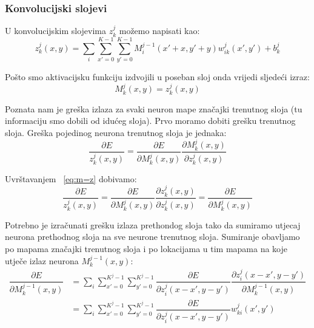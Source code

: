 \documentclass[times, utf8, zavrsni, numeric]{fer}
\begin{document}
\subsubsection{Konvolucijski slojevi}
U konvolucijskim slojevima $z_k^j$ možemo napisati kao:
\begin{equation}
z^j_k (x, y) = \sum_i \sum_{x'=0}^{K-1} \sum_{y'=0}^{K-1} M^{j-1}_i (x' + x, y' + y) w^j_{ik} (x', y') + b^j_k
\end{equation}

Pošto smo aktivacijsku funkciju izdvojili u poseban sloj onda vrijedi sljedeći izraz:
\begin{equation}\label{eq:m=z}
M^j_k (x, y) = z^j_k (x, y)
\end{equation}

Poznata nam je greška izlaza za svaki neuron mape značajki trenutnog sloja (tu informaciju smo dobili od idućeg sloja). Prvo moramo dobiti grešku trenutnog sloja. Greška pojedinog neurona trenutnog sloja je jednaka: 
\begin{equation}
\dfrac{\partial E}{z^j_k (x, y)} = \dfrac{\partial E}{\partial M^j_k (x, y)} \dfrac{\partial M^j_k (x, y)}{\partial z^j_k (x, y)}
\end{equation}

Uvrštavanjem ~\ref{eq:m=z} dobivamo:
\begin{equation}
\dfrac{\partial E}{z^j_k (x, y)} = \dfrac{\partial E}{\partial M^j_k (x, y)} \dfrac{\partial z^j_k (x, y)}{\partial z^j_k (x, y)} = \dfrac{\partial E}{\partial M^j_k (x, y)}
\end{equation}

Potrebno je izračunati  grešku izlaza prethondog sloja tako da sumiramo utjecaj neurona prethodnog sloja na sve neurone trenutnog sloja. Sumiranje obavljamo po mapama značajki trenutnog sloja i po lokacijama u tim mapama na koje utječe izlaz neurona $M^{j-1}_k (x, y)$:
\begin{equation}\label{eq:conv-sloj-err}
\begin{split}
\dfrac{\partial E}{\partial M^{j-1}_k (x, y)} &= \sum_i \sum_{x'=0}^{K^j-1} \sum_{y'=0}^{K^j-1} \dfrac{\partial E}{\partial z^j_{i} (x - x',y - y')} \dfrac{\partial z^j_{i} (x - x',y - y')}{\partial M^{j-1}_k (x, y)} \\
 &= \sum_i \sum_{x'=0}^{K^j-1} \sum_{y'=0}^{K^j-1} \dfrac{\partial E}{\partial z^j_{i} (x - x', y - y')} w^j_{ki}(x', y')
\end{split}
\end{equation}
\end{document}
